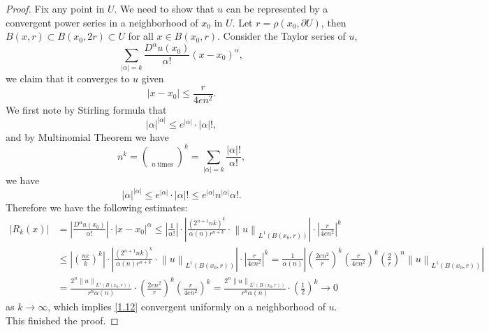 \begin{proof}
Fix any point in $U$. We need to show that $u$ can be represented by a convergent power series in a neighborhood of $x_0$ in $U$. Let $r=\rho(x_0,\partial U)$, then $B(x,r)\subset B(x_0,2r)\subset U$ for all $x\in B(x_0,r)$. Consider the Taylor series of $u$, 
\begin{equation}\label{1.12}
\sum_{\left| \alpha \right|=k}{\frac{D^{\alpha}u\left( x_0 \right)}{\alpha !}\left( x-x_0 \right) ^{\alpha}},
\end{equation}
we claim that it converges to $u$ given 
$$
\left| x-x_0 \right|\le \frac{r}{4en^2}.
$$
We first note by Stirling formula that 
$$
\left| \alpha \right|^{\left| \alpha \right|}\le e^{\left| \alpha \right|}\cdot \left| \alpha \right|!,
$$
and by Multinomial Theorem we have 
$$
n^k=\left( \mathop {\underbrace{1+1+\cdots +1}} \limits_{n\ \text{times}} \right) ^k=\sum_{\left| \alpha \right|=k}{\frac{\left| \alpha \right|!}{\alpha !}},
$$
we have 
$$
\left| \alpha \right|^{\left| \alpha \right|}\le e^{\left| \alpha \right|}\cdot \left| \alpha \right|!\le e^{\left| \alpha \right|}n^{\left| \alpha \right|}\alpha !.
$$
Therefore we have the following estimates: 
$$
\begin{aligned}
\left| R_k\left( x \right) \right|&=\left| \frac{D^{\alpha}u\left( x_0 \right)}{\alpha !} \right|\cdot \left| x-x_0 \right|^{\alpha}\le \left| \frac{1}{\alpha !} \right|\cdot \left| \frac{\left( 2^{n+1}nk \right) ^k}{\alpha \left( n \right) r^{n+k}}\cdot \left\| u \right\| _{L^1\left( B\left( x_0,r \right) \right)} \right|\cdot \left| \frac{r}{4en^2} \right|^k
\\
&\le \left| \left( \frac{ne}{k} \right) ^k \right|\cdot \left| \frac{\left( 2^{n+1}nk \right) ^k}{\alpha \left( n \right) r^{n+k}}\cdot \left\| u \right\| _{L^1\left( B\left( x_0,r \right) \right)} \right|\cdot \left| \frac{r}{4en^2} \right|^k=\frac{1}{\alpha \left( n \right)}\left| \left( \frac{2en^2}{r} \right) ^k\left( \frac{r}{4en^2} \right) ^k\left( \frac{2}{r} \right) ^n\left\| u \right\| _{L^1\left( B\left( x_0,r \right) \right)} \right|
\\
&=\frac{2^n\left\| u \right\| _{L^1\left( B\left( x_0,r \right) \right)}}{r^n\alpha \left( n \right)}\cdot \left( \frac{2en^2}{r} \right) ^k\left( \frac{r}{4en^2} \right) ^k=\frac{2^n\left\| u \right\| _{L^1\left( B\left( x_0,r \right) \right)}}{r^n\alpha \left( n \right)}\cdot \left( \frac{1}{2} \right) ^k\rightarrow 0
\end{aligned}
$$
as $k\to\infty$, which implies \eqref{1.12} convergent uniformly on a neighborhood of $u$. This finished the proof.
\end{proof}

